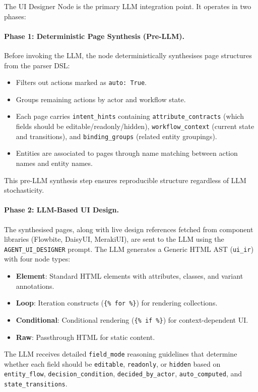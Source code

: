 The UI Designer Node is the primary LLM integration point. It operates in two phases:

\paragraph{Phase 1: Deterministic Page Synthesis (Pre-LLM).}
Before invoking the LLM, the node deterministically synthesises page structures from the parser DSL:
\begin{itemize}
    \item Filters out actions marked as \texttt{auto: True}.
    \item Groups remaining actions by actor and workflow state.
    \item Each page carries \texttt{intent\_hints} containing \texttt{attribute\_contracts} (which fields should be editable/readonly/hidden), \texttt{workflow\_context} (current state and transitions), and \texttt{binding\_groups} (related entity groupings).
    \item Entities are associated to pages through name matching between action names and entity names.
\end{itemize}

This pre-LLM synthesis step ensures reproducible structure regardless of LLM stochasticity.

\paragraph{Phase 2: LLM-Based UI Design.}
The synthesised pages, along with live design references fetched from component libraries (Flowbite, DaisyUI, MerakiUI), are sent to the LLM using the \texttt{AGENT\_UI\_DESIGNER} prompt. The LLM generates a Generic HTML AST (\texttt{ui\_ir}) with four node types:
\begin{itemize}
    \item \textbf{Element}: Standard HTML elements with attributes, classes, and variant annotations.
    \item \textbf{Loop}: Iteration constructs (\texttt{\{\% for \%\}}) for rendering collections.
    \item \textbf{Conditional}: Conditional rendering (\texttt{\{\% if \%\}}) for context-dependent UI.
    \item \textbf{Raw}: Passthrough HTML for static content.
\end{itemize}

The LLM receives detailed \texttt{field\_mode} reasoning guidelines that determine whether each field should be \texttt{editable}, \texttt{readonly}, or \texttt{hidden} based on \texttt{entity\_flow}, \texttt{decision\_condition}, \texttt{decided\_by\_actor}, \texttt{auto\_computed}, and \texttt{state\_transitions}.

